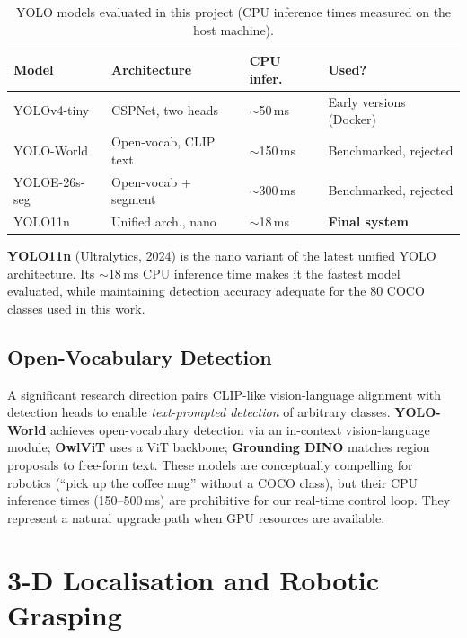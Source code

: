 \begin{table}[H]
\centering
\caption{YOLO models evaluated in this project (CPU inference times measured on the host machine).}
\label{tab:yolo_comparison}
\small
\begin{tabular}{llll}
\toprule
\textbf{Model} & \textbf{Architecture} & \textbf{CPU infer.} & \textbf{Used?} \\
\midrule
YOLOv4-tiny   & CSPNet, two heads      & $\sim$50\,ms  & Early versions (Docker) \\
YOLO-World    & Open-vocab, CLIP text  & $\sim$150\,ms & Benchmarked, rejected \\
YOLOE-26s-seg & Open-vocab + segment   & $\sim$300\,ms & Benchmarked, rejected \\
YOLO11n       & Unified arch., nano    & $\sim$18\,ms  & \textbf{Final system} \\
\bottomrule
\end{tabular}
\normalsize
\end{table}

\textbf{YOLO11n} \cite{ultralytics2024yolo11} (Ultralytics, 2024) is the nano variant
of the latest unified YOLO architecture.
Its $\sim$18\,ms CPU inference time makes it the fastest model evaluated, while
maintaining detection accuracy adequate for the 80 COCO classes used in this work.

\subsection{Open-Vocabulary Detection}

A significant research direction pairs CLIP-like vision-language alignment with
detection heads to enable \emph{text-prompted detection} of arbitrary classes.
\textbf{YOLO-World} \cite{cheng2024yoloworld} achieves open-vocabulary detection via
an in-context vision-language module;
\textbf{OwlViT} \cite{minderer2022owlvit} uses a ViT backbone;
\textbf{Grounding DINO} \cite{liu2023gdino} matches region proposals to free-form
text.
These models are conceptually compelling for robotics (``pick up the coffee mug''
without a COCO class), but their CPU inference times (150--500\,ms) are prohibitive
for our real-time control loop.
They represent a natural upgrade path when GPU resources are available.

\section{3-D Localisation and Robotic Grasping}
\label{sec:grasp}

